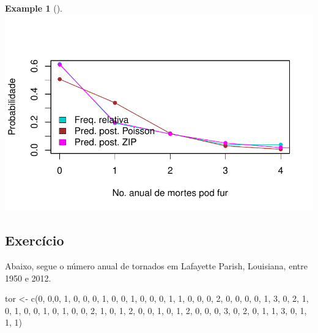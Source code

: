 \documentclass[
  letterpaper,
  DIV=11,
  numbers=noendperiod]{scrreprt}
\newenvironment{Shaded}{\begin{snugshade}}{\end{snugshade}}
\newcommand{\DecValTok}[1]{\textcolor[rgb]{0.68,0.00,0.00}{#1}}
\newcommand{\FunctionTok}[1]{\textcolor[rgb]{0.28,0.35,0.67}{#1}}
\newcommand{\NormalTok}[1]{\textcolor[rgb]{0.00,0.23,0.31}{#1}}
\newcommand{\OtherTok}[1]{\textcolor[rgb]{0.00,0.23,0.31}{#1}}
\theoremstyle{definition}
\theoremstyle{plain}
\theoremstyle{definition}
\newtheorem{example}{Example}[chapter]
\theoremstyle{remark}
\begin{document}
\begin{example}[]
\includegraphics{misturas_files/figure-pdf/unnamed-chunk-6-1.pdf}

\subsection{Exercício}\label{exercuxedcio-1}

Abaixo, segue o número anual de tornados em Lafayette Parish, Louisiana,
entre 1950 e 2012.

\begin{Shaded}
\begin{Highlighting}[]
\NormalTok{tor }\OtherTok{\textless{}{-}} \FunctionTok{c}\NormalTok{(}\DecValTok{0}\NormalTok{, }\DecValTok{0}\NormalTok{,}\DecValTok{0}\NormalTok{, }\DecValTok{1}\NormalTok{, }\DecValTok{0}\NormalTok{, }\DecValTok{0}\NormalTok{, }\DecValTok{0}\NormalTok{, }\DecValTok{1}\NormalTok{, }\DecValTok{0}\NormalTok{, }\DecValTok{0}\NormalTok{,}
\DecValTok{1}\NormalTok{, }\DecValTok{0}\NormalTok{, }\DecValTok{0}\NormalTok{, }\DecValTok{0}\NormalTok{, }\DecValTok{1}\NormalTok{, }\DecValTok{1}\NormalTok{, }\DecValTok{0}\NormalTok{, }\DecValTok{0}\NormalTok{, }\DecValTok{0}\NormalTok{, }\DecValTok{2}\NormalTok{,}
\DecValTok{0}\NormalTok{, }\DecValTok{0}\NormalTok{, }\DecValTok{0}\NormalTok{, }\DecValTok{0}\NormalTok{, }\DecValTok{1}\NormalTok{, }\DecValTok{3}\NormalTok{, }\DecValTok{0}\NormalTok{, }\DecValTok{2}\NormalTok{, }\DecValTok{1}\NormalTok{, }\DecValTok{0}\NormalTok{,}
\DecValTok{1}\NormalTok{, }\DecValTok{0}\NormalTok{, }\DecValTok{0}\NormalTok{, }\DecValTok{1}\NormalTok{, }\DecValTok{0}\NormalTok{, }\DecValTok{1}\NormalTok{, }\DecValTok{0}\NormalTok{, }\DecValTok{0}\NormalTok{, }\DecValTok{2}\NormalTok{, }\DecValTok{1}\NormalTok{,}
\DecValTok{0}\NormalTok{, }\DecValTok{1}\NormalTok{, }\DecValTok{2}\NormalTok{, }\DecValTok{0}\NormalTok{, }\DecValTok{0}\NormalTok{, }\DecValTok{1}\NormalTok{, }\DecValTok{0}\NormalTok{, }\DecValTok{1}\NormalTok{, }\DecValTok{2}\NormalTok{, }\DecValTok{0}\NormalTok{,}
\DecValTok{0}\NormalTok{, }\DecValTok{0}\NormalTok{, }\DecValTok{3}\NormalTok{, }\DecValTok{0}\NormalTok{, }\DecValTok{2}\NormalTok{, }\DecValTok{0}\NormalTok{, }\DecValTok{1}\NormalTok{, }\DecValTok{1}\NormalTok{, }\DecValTok{3}\NormalTok{, }\DecValTok{0}\NormalTok{,}
\DecValTok{1}\NormalTok{, }\DecValTok{1}\NormalTok{, }\DecValTok{1}\NormalTok{)}
\end{Highlighting}
\end{Shaded}


\end{example}
\end{document}
